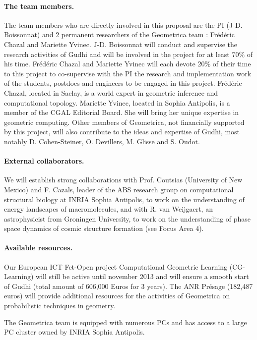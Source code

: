 \paragraph{The team members.}
The team members who are directly involved in this proposal are the PI (J-D. Boissonnat) and 2 permanent researchers of the Geometrica team : Fr\'ed\'eric Chazal and Mariette Yvinec.  J-D. Boissonnat will conduct and supervise the research activities of Gudhi and will be involved in the project for at least 70\% of his time.  Fr\'ed\'eric Chazal and Mariette Yvinec will each devote 20\% of their time to this project to co-supervise with the PI the research and implementation work of the students, postdocs and engineers to be engaged in this project. Fr\'ed\'eric Chazal, located in Saclay,  is a world expert in geometric inference and computational topology. Mariette Yvinec, located in Sophia Antipolis, is a member of the CGAL Editorial Board.  She will bring her unique expertise in geometric computing. Other members of Geometrica, not financially supported by this project, will also contribute to the ideas and expertise of Gudhi, most notably D. Cohen-Steiner, O. Devillers, M. Glisse and S. Oudot. 

\paragraph{External collaborators.} We will establish  strong collaborations with Prof. Coutsias (University of New Mexico) and
F. Cazals, leader of the ABS research group on computational structural biology at INRIA Sophia Antipolis, to work on the understanding of energy landscapes of macromolecules,  and with R. van Weijgaert, an astrophysicist from Groningen University, to work on the understanding of phase space dynamics of cosmic structure formation (see Focus Area 4).

\paragraph{Available resources.} Our European ICT Fet-Open project Computational Geometric Learning (CG-Learning) will still be active until november 2013 and will ensure a smooth start of Gudhi  (total amount of 606,000 Euros for 3 years).  The ANR Pr\'esage (182,487 euros) will provide additional resources for the activities of Geometrica on probabilistic techniques in geometry. 

The Geometrica team is equipped with numerous PCs and has access to a large PC cluster owned by INRIA Sophia Antipolis.

